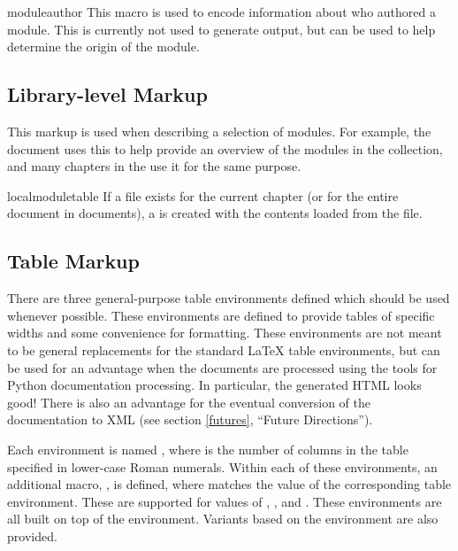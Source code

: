 \documentclass{howto}
\begin{document}
  \begin{macrodesc}{moduleauthor}{}
    This macro is used to encode information about who authored a
    module.  This is currently not used to generate output, but can be
    used to help determine the origin of the module.
  \end{macrodesc}


  \subsection{Library-level Markup}

    This markup is used when describing a selection of modules.  For
    example, the  document uses this to help provide an overview of the
    modules in the collection, and many chapters in the
     use it for
    the same purpose.

  \begin{macrodesc}{localmoduletable}{}
    If a  file exists for the current
    chapter (or for the entire document in  documents), a
     is created with the contents loaded from the
     file.
  \end{macrodesc}


  \subsection{Table Markup}

    There are three general-purpose table environments defined which
    should be used whenever possible.  These environments are defined
    to provide tables of specific widths and some convenience for
    formatting.  These environments are not meant to be general
    replacements for the standard \LaTeX{} table environments, but can
    be used for an advantage when the documents are processed using
    the tools for Python documentation processing.  In particular, the
    generated HTML looks good!  There is also an advantage for the
    eventual conversion of the documentation to XML (see section
    \ref{futures}, ``Future Directions'').

    Each environment is named , where 
    is the number of columns in the table specified in lower-case
    Roman numerals.  Within each of these environments, an additional
    macro, , is defined, where 
    matches the  value of the corresponding table
    environment.  These are supported for  values of
    , , and .  These environments are all
    built on top of the  environment.  Variants based on
    the  environment are also provided.
\end{document}
